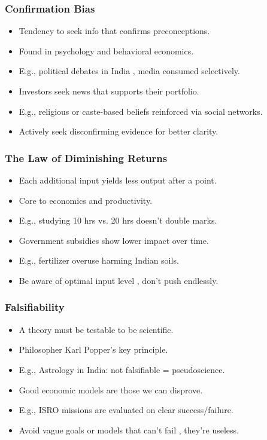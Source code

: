 \begin{frame}[fragile]\frametitle{Confirmation Bias}
  \begin{itemize}
    \item Tendency to seek info that confirms preconceptions.
    \item Found in psychology and behavioral economics.
    \item E.g., political debates in India , media consumed selectively.
    \item Investors seek news that supports their portfolio.
    \item E.g., religious or caste-based beliefs reinforced via social networks.
    \item Actively seek disconfirming evidence for better clarity.
  \end{itemize}
\end{frame}

\begin{frame}[fragile]\frametitle{The Law of Diminishing Returns}
  \begin{itemize}
    \item Each additional input yields less output after a point.
    \item Core to economics and productivity.
    \item E.g., studying 10 hrs vs. 20 hrs doesn't double marks.
    \item Government subsidies show lower impact over time.
    \item E.g., fertilizer overuse harming Indian soils.
    \item Be aware of optimal input level , don't push endlessly.
  \end{itemize}
\end{frame}

\begin{frame}[fragile]\frametitle{Falsifiability}
  \begin{itemize}
    \item A theory must be testable to be scientific.
    \item Philosopher Karl Popper's key principle.
    \item E.g., Astrology in India: not falsifiable = pseudoscience.
    \item Good economic models are those we can disprove.
    \item E.g., ISRO missions are evaluated on clear success/failure.
    \item Avoid vague goals or models that can't fail , they're useless.
  \end{itemize}
\end{frame}

